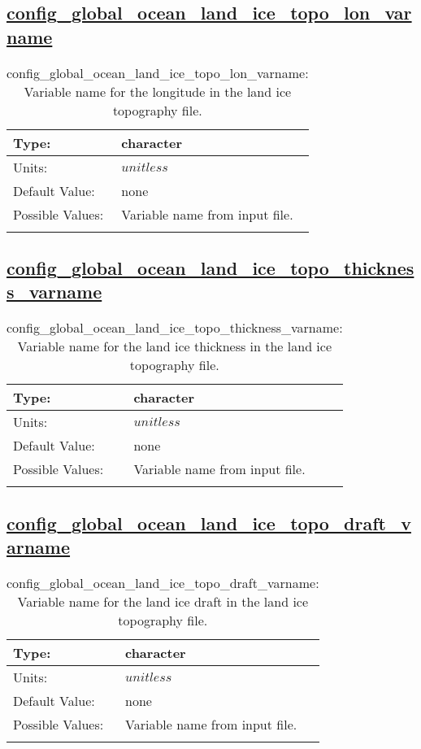 \subsection[config\_global\_ocean\_land\_ice\_topo\_lon\_varname]{\hyperref[sec:nm_tab_global_ocean]{config\_global\_ocean\_land\_ice\_topo\_lon\_varname}}
\label{subsec:nm_sec_config_global_ocean_land_ice_topo_lon_varname}
\begin{center}
\begin{longtable}{| p{2.0in} || p{4.0in} |}
    \hline
    Type: & character \\
    \hline
    Units: & $unitless$ \\
    \hline
    Default Value: & none \\
    \hline
    Possible Values: & Variable name from input file. \\
    \hline
    \caption{config\_global\_ocean\_land\_ice\_topo\_lon\_varname: Variable name for the longitude in the land ice topography file.}
\end{longtable}
\end{center}
\subsection[config\_global\_ocean\_land\_ice\_topo\_thickness\_varname]{\hyperref[sec:nm_tab_global_ocean]{config\_global\_ocean\_land\_ice\_topo\_thickness\_varname}}
\label{subsec:nm_sec_config_global_ocean_land_ice_topo_thickness_varname}
\begin{center}
\begin{longtable}{| p{2.0in} || p{4.0in} |}
    \hline
    Type: & character \\
    \hline
    Units: & $unitless$ \\
    \hline
    Default Value: & none \\
    \hline
    Possible Values: & Variable name from input file. \\
    \hline
    \caption{config\_global\_ocean\_land\_ice\_topo\_thickness\_varname: Variable name for the land ice thickness in the land ice topography file.}
\end{longtable}
\end{center}
\subsection[config\_global\_ocean\_land\_ice\_topo\_draft\_varname]{\hyperref[sec:nm_tab_global_ocean]{config\_global\_ocean\_land\_ice\_topo\_draft\_varname}}
\label{subsec:nm_sec_config_global_ocean_land_ice_topo_draft_varname}
\begin{center}
\begin{longtable}{| p{2.0in} || p{4.0in} |}
    \hline
    Type: & character \\
    \hline
    Units: & $unitless$ \\
    \hline
    Default Value: & none \\
    \hline
    Possible Values: & Variable name from input file. \\
    \hline
    \caption{config\_global\_ocean\_land\_ice\_topo\_draft\_varname: Variable name for the land ice draft in the land ice topography file.}
\end{longtable}
\end{center}

